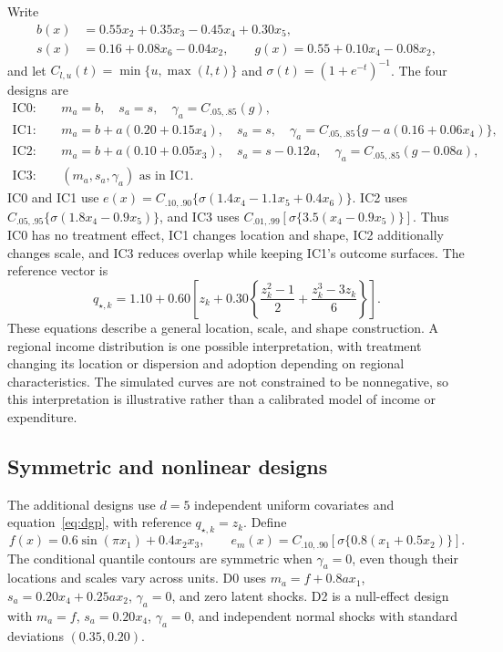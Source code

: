 Write
\begin{align*}
 b(x)&=0.55x_2+0.35x_3-0.45x_4+0.30x_5,\\
 s(x)&=0.16+0.08x_6-0.04x_2,\qquad
 g(x)=0.55+0.10x_4-0.08x_2,
\end{align*}
and let $C_{l,u}(t)=\min\{u,\max(l,t)\}$ and $\sigma(t)=(1+e^{-t})^{-1}$. The four designs are
\begin{align*}
\mathrm{IC0}:\quad &m_a=b,\quad s_a=s,\quad \gamma_a=C_{.05,.85}(g),\\
\mathrm{IC1}:\quad &m_a=b+a(0.20+0.15x_4),\quad s_a=s,\quad
 \gamma_a=C_{.05,.85}\{g-a(0.16+0.06x_4)\},\\
\mathrm{IC2}:\quad &m_a=b+a(0.10+0.05x_3),\quad s_a=s-0.12a,\quad
 \gamma_a=C_{.05,.85}(g-0.08a),\\
\mathrm{IC3}:\quad &(m_a,s_a,\gamma_a)\text{ as in IC1}.
\end{align*}
IC0 and IC1 use $e(x)=C_{.10,.90}\{\sigma(1.4x_4-1.1x_5+0.4x_6)\}$. IC2 uses $C_{.05,.95}\{\sigma(1.8x_4-0.9x_5)\}$, and IC3 uses $C_{.01,.99}[\sigma\{3.5(x_4-0.9x_5)\}]$. Thus IC0 has no treatment effect, IC1 changes location and shape, IC2 additionally changes scale, and IC3 reduces overlap while keeping IC1's outcome surfaces. The reference vector is
\[
 q_{\star,k}=1.10+0.60\left[z_k+0.30\left\{\frac{z_k^2-1}{2}+\frac{z_k^3-3z_k}{6}\right\}\right].
\]
These equations describe a general location, scale, and shape construction. A regional income distribution is one possible interpretation, with treatment changing its location or dispersion and adoption depending on regional characteristics. The simulated curves are not constrained to be nonnegative, so this interpretation is illustrative rather than a calibrated model of income or expenditure.

\subsection{Symmetric and nonlinear designs}\label{sec:nonlinear-design}

The additional designs use $d=5$ independent uniform covariates and equation~\eqref{eq:dgp}, with reference $q_{\star,k}=z_k$. Define
\[
 f(x)=0.6\sin(\pi x_1)+0.4x_2x_3,\qquad
 e_m(x)=C_{.10,.90}[\sigma\{0.8(x_1+0.5x_2)\}].
\]
The conditional quantile contours are symmetric when $\gamma_a=0$, even though their locations and scales vary across units. D0 uses $m_a=f+0.8ax_1$, $s_a=0.20x_4+0.25ax_2$, $\gamma_a=0$, and zero latent shocks. D2 is a null-effect design with $m_a=f$, $s_a=0.20x_4$, $\gamma_a=0$, and independent normal shocks with standard deviations $(0.35,0.20)$.

